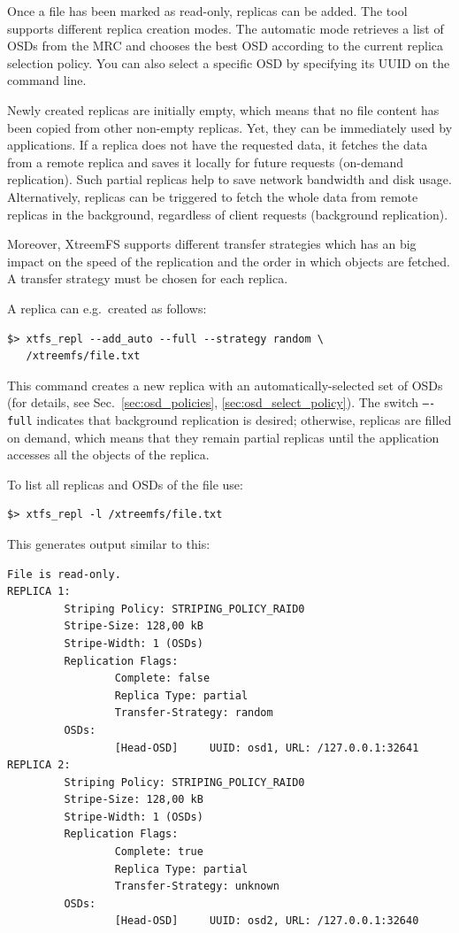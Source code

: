 \documentclass[a4paper,10pt]{book}
\begin{document}
Once a file has been marked as read-only, replicas can be added. The tool supports different replica creation modes. The automatic mode retrieves a list of OSDs from the MRC and chooses the best OSD according to the current replica selection policy. You can also select a specific OSD by specifying its UUID on the command line.

Newly created replicas are initially empty, which means that no file content has been copied from other non-empty replicas. Yet, they can be immediately used by applications. If a replica does not have the requested data, it fetches the data from a remote replica and saves it locally for future requests (on-demand replication). Such partial replicas help to save network bandwidth and disk usage. Alternatively, replicas can be triggered to fetch the whole data from remote replicas in the background, regardless of client requests (background replication).

Moreover, XtreemFS supports different transfer strategies which has an big impact on the speed of the replication and the order in which objects are fetched. A transfer strategy must be chosen for each replica.

A replica can e.g.\ created as follows:

\begin{verbatim}
$> xtfs_repl --add_auto --full --strategy random \
   /xtreemfs/file.txt
\end{verbatim}

This command creates a new replica with an automatically-selected set of OSDs (for details, see Sec.\ \ref{sec:osd_policies}, \ref{sec:osd_select_policy}). The switch \texttt{----full} indicates that background replication is desired; otherwise, replicas are filled on demand, which means that they remain partial replicas until the application accesses all the objects of the replica.

To list all replicas and OSDs of the file use:

\begin{verbatim}
$> xtfs_repl -l /xtreemfs/file.txt
\end{verbatim}

This generates output similar to this:

\begin{verbatim}
File is read-only.
REPLICA 1:
         Striping Policy: STRIPING_POLICY_RAID0
         Stripe-Size: 128,00 kB
         Stripe-Width: 1 (OSDs)
         Replication Flags:
                 Complete: false
                 Replica Type: partial
                 Transfer-Strategy: random
         OSDs:
                 [Head-OSD]     UUID: osd1, URL: /127.0.0.1:32641
REPLICA 2:
         Striping Policy: STRIPING_POLICY_RAID0
         Stripe-Size: 128,00 kB
         Stripe-Width: 1 (OSDs)
         Replication Flags:
                 Complete: true
                 Replica Type: partial
                 Transfer-Strategy: unknown
         OSDs:
                 [Head-OSD]     UUID: osd2, URL: /127.0.0.1:32640
\end{verbatim}
\end{document}
